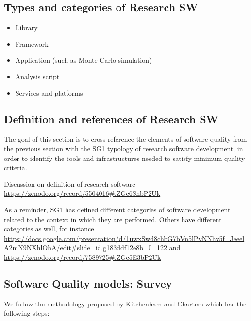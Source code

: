 \subsection{Types and categories of Research SW}

\begin{itemize}
\item Library
\item Framework
\item Application (such as Monte-Carlo simulation)
\item Analysis script
\item Services and platforms
\end{itemize}


\subsection{Definition and references of Research SW}


The goal of this section is to cross-reference the elements of
software quality from the previous section with the SG1 typology of
research software development, in order to identify the tools and
infrastructures needed to satisfy minimum quality criteria. 

Discussion on definition of research software \url{https://zenodo.org/record/5504016#.ZGc6SnbP2Uk}

As a reminder, SG1 has defined different categories of software
development related to the context in which they are performed. Others have different categories as well, for instance \url{https://docs.google.com/presentation/d/1uwxSwd8chbG7bVn5lPvNNhv5f_JeeelA2mN9NXhlOhA/edit#slide=id.g183ddf12e8b_0_122} and \url{https://zenodo.org/record/7589725#.ZGc5E3bP2Uk}

\subsection{Software Quality models: Survey}

We follow the methodology proposed by Kitchenham and Charters which has the following steps:


